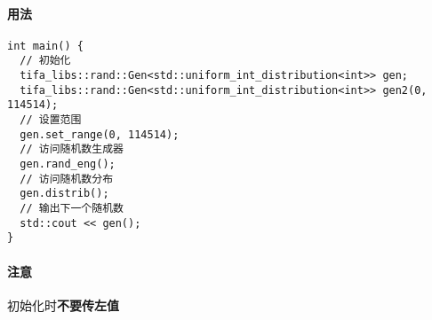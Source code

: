 \paragraph{用法}

\begin{verbatim}
int main() {
  // 初始化
  tifa_libs::rand::Gen<std::uniform_int_distribution<int>> gen;
  tifa_libs::rand::Gen<std::uniform_int_distribution<int>> gen2(0, 114514);
  // 设置范围
  gen.set_range(0, 114514);
  // 访问随机数生成器
  gen.rand_eng();
  // 访问随机数分布
  gen.distrib();
  // 输出下一个随机数
  std::cout << gen();
}
\end{verbatim}

\paragraph{注意}

初始化时\textbf{不要传左值}
